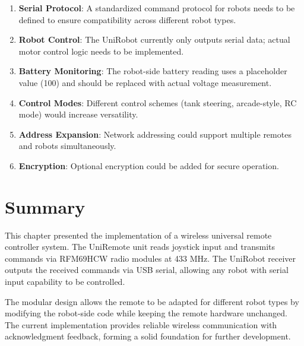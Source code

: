 \begin{enumerate}
    \item \textbf{Serial Protocol}: A standardized command protocol for robots needs to be defined to ensure compatibility across different robot types.
    
    \item \textbf{Robot Control}: The UniRobot currently only outputs serial data; actual motor control logic needs to be implemented.
    
    \item \textbf{Battery Monitoring}: The robot-side battery reading uses a placeholder value (100) and should be replaced with actual voltage measurement.
    
    \item \textbf{Control Modes}: Different control schemes (tank steering, arcade-style, RC mode) would increase versatility.
    
    \item \textbf{Address Expansion}: Network addressing could support multiple remotes and robots simultaneously.
    
    \item \textbf{Encryption}: Optional encryption could be added for secure operation.
\end{enumerate}

\section{Summary}

This chapter presented the implementation of a wireless universal remote controller system. The UniRemote unit reads joystick input and transmits commands via RFM69HCW radio modules at 433 MHz. The UniRobot receiver outputs the received commands via USB serial, allowing any robot with serial input capability to be controlled.

The modular design allows the remote to be adapted for different robot types by modifying the robot-side code while keeping the remote hardware unchanged. The current implementation provides reliable wireless communication with acknowledgment feedback, forming a solid foundation for further development.

